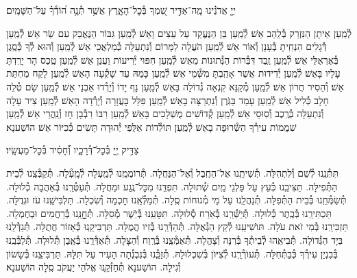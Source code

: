 \documentclass[twoside, openany, parskip=half, 11pt]{book}
\begin{document}
יְיָ֤ אֲדֹנֵ֗ינוּ מָֽה־אַדִּ֣יר שִׁ֭מְךָ בְּ֯כׇל־הָאָ֑רֶץ אֲשֶׁ֥ר תְּ֯נָ֥ה ה֝וֹדְ֯ךָ֗ עַל־הַשָּׁמָֽיִם׃


לְ֯מַֽעַן אֵיתָן הַנִּזְרַק בְּ֯לַֽהַב אֵשׁ׃ לְ֯מַֽעַן בֵּן הַנֶּעֱקַד עַל עֵצִים וָאֵשׁ׃ לְ֯מַֽעַן גִּבּוֹר הַנֶּאֱבַק עִם שַׂר אֵשׁ׃ לְ֯מַֽעַן דְּ֯גָלִים הִנְחִֽיתָ בְּ֯עָנָן וְ֯אוֹר אֵשׁ׃ לְ֯מַֽעַן הֹעֲלָה לַמָּרוֹם וְ֯נִתְעַלָּה כְּ֯מַלְאֲכֵי אֵשׁ׃ לְ֯מַֽעַן וְ֯הוּא לְ֯ךָ כְּ֯סֶֽגֶן בְּ֯אֶרְאֶלֵּי אֵשׁ׃ לְ֯מַֽעַן זֶֽבֶד דִּבְּ֯רוֹת הַנְּ֯תוּנוֹת מֵאֵשׁ לְ֯מַֽעַן חִפּוּי יְ֯רִיעוֹת וַעֲנַן אֵשׁ׃ לְ֯מַֽעַן טֶֽכֶס הָר יָרַֽדְתָּ עָלָיו בָּאֵשׁ׃ לְ֯מַֽעַן יְ֯דִידוּת אֲשֶׁר אָהַֽבְתָּ מִשְּׁ֯מֵי אֵשׁ׃ לְ֯מַֽעַן כָּמַהּ עַד שָׁקְ֯עָה הָאֵשׁ לְ֯מַֽעַן לָקַח מַחְתַּת אֵשׁ׃ וְ֯הֵסִיר חֲרוֹן אֵשׁ׃ לְ֯מַֽעַן מְ֯קַנֵּא קִנְאָה גְ֯דוֹלָה בָּאֵשׁ לְ֯מַֽעַן נָף יָדוֹ וְ֯יָרְ֯דוּ אַבְנֵי אֵשׁ׃ לְ֯מַֽעַן שָׂם טְ֯לֵה חָלָב כְּ֯לִיל אֵשׁ׃ לְ֯מַֽעַן עָמַד בַּגֹּֽרֶן וְ֯נִתְרַצָּה בָאֵשׁ׃ לְ֯מַֽעַן פִּלֵּל בָּעֲזָרָה וְ֯יָרְ֯דָה הָאֵשׁ׃ לְ֯מַֽעַן צִיר עָלָה וְ֯נִתְעַלָּה בְּ֯רֶֽכֶב וְ֯סֽוּסֵי אֵשׁ׃ לְ֯מַֽעַן קְ֯דוֹשִׁים מֻשְׁלָכִים בָּאֵשׁ׃ לְ֯מַֽעַן רִבּוֹ רִבְ֯בָן חָז וְ֯נַֽהֲרֵי אֵשׁ׃
לְ֯מַֽעַן שִׁמֲמוֹת עִירְ֯ךָ הַשְּׂ֯רוּפָה בָאֵשׁ׃
לְ֯מַֽעַן תּוֹלְ֯דוֹת אַלֻּפֵי יְ֯הוּדָה תָּשִׂים כְּ֯כִיּוֹר אֵשׁ׃ הוֹשַׁענָא׃

צַדִּ֣יק יְ֖יָ בְּ֯כׇל־דְּ֯רָכָ֑יו וְ֯֝חָסִ֗יד בְּ֯כׇל־מַעֲשָֽׂיו׃

תִּתְּ֯נֵֽנוּ לְ֯שֵׁם וְ֯לִתְהִלָּה.
תְּ֯שִׁיתֵֽנוּ אֶל־הַחֶֽבֶל וְ֯אֶל־הַנַּחֲלָה.
תְּ֯רוֹמֲמֵֽנוּ לְ֯מַֽעְלָה לְ֯מָֽעְ֯לָה.
תְּ֯קַבְּ֯צֵֽנוּ לְ֯בֵית הַתְּ֯פִילָּה.
תַּצִּיבֵֽנוּ כְּ֯עֵץ עַל פַּלְגֵי מַֽיִם שְׁ֯תוּלָה.
תִּפְדֵּֽנוּ מִכׇּל־נֶֽגַע וּמַחֲלָה.
תְּ֯עַטְּ֯רֵֽנוּ בְּ֯אַהֲבָה כְ֯לוּלָה.
תְּ֯שַׂמְּ֯חֵֽנוּ בְּ֯בֵית הַתְּ֯פִלָּה.
תְּ֯נַהֲלֵֽנוּ עַל מֵי מְ֯נוּחוֹת סֶֽלָה.
תְּ֯מַלְּ֯אֵֽנוּ חׇכְמָה וְ֯שִׂכְלָה.
תַּלְבִּישֵֽׁנוּ עֹז וּגְדֻלָּה.
תַּכְתִּירֵֽנוּ בְּ֯כֶֽתֶר כְּ֯לוּלָה.
תְּ֯יַשְּׁ֯רֵֽנוּ בְּ֯אֹֽרַח סְ֯לוּלָה.
תִּטָּעֵֽנוּ בְּ֯יֹֽשֶׁר מְ֯סִלָּה.
תְּ֯חׇׇׇׇנֵּֽנוּ בְּ֯רַחֲמִים וּבְחֶמְלָה.
תַּזְכִּירֵֽנוּ בְּ֯מִי זֹאת עֹלָה.
תּוׂשִׁיעֵֽנוּ לְ֯קֵץ הַגְּ֯אֻלָּה.
תְּ֯הַדְּ֯רֵֽנוּ בְּ֯זִיו הֲמֻלָּה.
תַּדְבִּיקֵֽנוּ כְּ֯אֵזוֹר חֲתֻלָּה.
תְּ֯גַדְּ֯לֵֽנוּ בַּיָד הַגְּ֯דוׂלָה.
תְּ֯בִיאֵֽהוּ לְ֯בֵיתְ֯ךָ בְּ֯רִנָּה וְ֯צָהֳלָה.
תְּ֯אַמְּ֯צֵֽנוּ בְּ֯רֶֽוַח וְ֯הַצָּלָה.
תְּ֯אַדְּ֯רְֵנוּ בְּ֯אֶֽבֶן תְּ֯לוּלָה.
תְּ֯לַבְּ֯בֵֽנוּ בְּ֯בִנְיַן עִירְ֯ךָ כְּ֯בַתְּ֯חִלָּה.
תְּ֯עוׂרְ֯רֵֽנוּ לְ֯צִיּוׂן בְּ֯שִׁכְלוּלָהּ.
תְּ֯זַכְֵּ֯נוּ בְּ֯נִבְנְ֯תָה הָעִיר עַל תִּלָּהּ.
תַּרְבִּיצֵֽנוּ בְּ֯שָׂשׂוֹן וְ֯גִילָה.
הוֹשַׁענָא תְּ֯חַזְּ֯קֵֽנוּ אֱלֹהֵי יַעֲקֹב סֶֽלָה הוֹשַׁענָא׃
\end{document}
